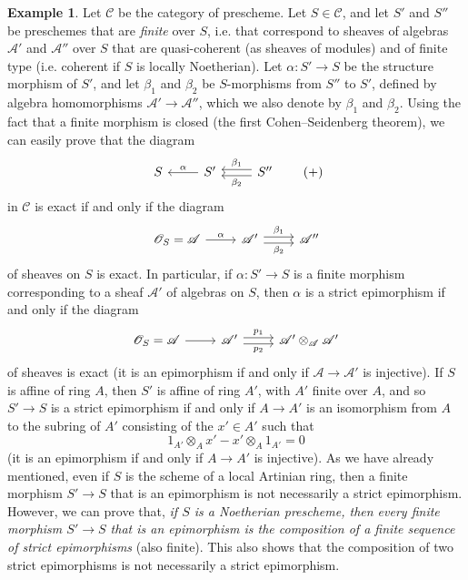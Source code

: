 \documentclass{article}
\theoremstyle{plain}
\theoremstyle{definition}
\newtheorem*{example*}{Example}
\newcommand{\sh}[1]{{\mathscr{#1}}}
\newcommand{\cat}[1]{{\mathcal{#1}}}
\newcommand{\oldpage}[1]{\marginpar{\footnotesize$\Big\vert$ \textit{p.~#1}}}
\begin{document}
\begin{example*}
  Let $\cat{C}$ be the category of prescheme.
  Let $S\in\cat{C}$, and let $S'$ and $S''$ be preschemes that are \emph{finite} over $S$, i.e. that correspond to sheaves of algebras $\sh{A}'$ and $\sh{A}''$ over $S$ that are quasi-coherent (as sheaves of modules) and of finite type (i.e. coherent if $S$ is locally Noetherian).
  Let $\alpha\colon S'\to S$ be the structure morphism of $S'$, and let $\beta_1$ and $\beta_2$ be $S$-morphisms from $S''$ to $S'$, defined by algebra homomorphisms $\sh{A}'\to\sh{A}''$, which we also denote by $\beta_1$ and $\beta_2$.
  Using the fact that a finite morphism is closed (the first Cohen--Seidenberg theorem), we can easily prove that the diagram
  \[
  \label{equation-example:A.2.b}
    \begin{tikzcd}
      S
      & S' \lar[swap,"\alpha"]
      & S'' \lar[shift left=1,"\beta_2"] \lar[shift right=1,swap,"\beta_1"]
    \end{tikzcd}
  \tag{+}
  \]
  in $\cat{C}$ is exact if and only if the diagram
\oldpage{190-08}
  \[
    \begin{tikzcd}
      \sh{O}_S = \sh{A} \rar["\alpha"]
      & \sh{A}' \rar[shift left=1,"\beta_1"] \rar[shift right=1,swap,"\beta_2"]
      & \sh{A}''
    \end{tikzcd}
  \]
  of sheaves on $S$ is exact.
  In particular, if $\alpha\colon S'\to S$ is a finite morphism corresponding to a sheaf $\sh{A}'$ of algebras on $S$, then $\alpha$ is a strict epimorphism if and only if the diagram
  \[
    \begin{tikzcd}
      \sh{O}_S = \sh{A} \rar
      & \sh{A}' \rar[shift left=1,"p_1"] \rar[shift right=1,swap,"p_2"]
      & \sh{A}'\otimes_{\sh{A}}\sh{A}'
    \end{tikzcd}
  \]
  of sheaves is exact (it is an epimorphism if and only if $\sh{A}\to\sh{A}'$ is injective).
  If $S$ is affine of ring $A$, then $S'$ is affine of ring $A'$, with $A'$ finite over $A$, and so $S'\to S$ is a strict epimorphism if and only if $A\to A'$ is an isomorphism from $A$ to the subring of $A'$ consisting of the $x'\in A'$ such that
  \[
    1_{A'}\otimes_A x' - x'\otimes_A 1_{A'} = 0
  \]
  (it is an epimorphism if and only if $A\to A'$ is injective).
  As we have already mentioned, even if $S$ is the scheme of a local Artinian ring, then a finite morphism $S'\to S$ that is an epimorphism is not necessarily a strict epimorphism.
  However, we can prove that, \emph{if $S$ is a Noetherian prescheme, then every finite morphism $S'\to S$ that is an epimorphism is the composition of a finite sequence of strict epimorphisms} (also finite).
  This also shows that the composition of two strict epimorphisms is not necessarily a strict epimorphism.
\end{example*}
\end{document}

